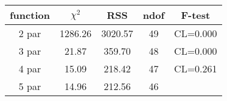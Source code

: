 \begin{tabular}{c|c|c|c|c}
function & $\chi^2$ & RSS & ndof & F-test \\
\hline
2 par & 1286.26 & 3020.57 & 49 & CL=0.000 \\
3 par & 21.87 & 359.70 & 48 & CL=0.000 \\
4 par & 15.09 & 218.42 & 47 & CL=0.261 \\
5 par & 14.96 & 212.56 & 46 & \\
\hline
\end{tabular}
